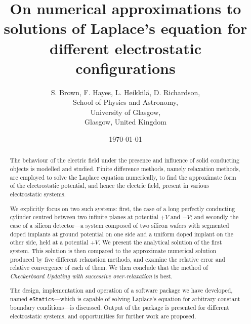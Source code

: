 \documentclass[11pt, a4paper]{article}
\begin{document}
\title{On numerical approximations to solutions of Laplace's equation for different
electrostatic configurations}
\author{S. Brown, F. Hayes, L. Heikkil{\"a}, D. Richardson,\\
	School of Physics and Astronomy,\\
	University of Glasgow,\\
	Glasgow, United Kingdom}
\date{\today}
\maketitle

\begin{abstract}

The behaviour of the electric field under the presence and influence of solid
conducting objects is modelled and studied. Finite difference methods, namely
relaxation methods, are employed to solve the Laplace equation numerically,
to find the approximate form of the electrostatic potential, and hence the electric
field, present in various electrostatic systems.

We explicitly focus on two such systems: first, the case of a long perfectly conducting
cylinder centred between two infinite planes at potential $+V$ and $-V$; and secondly 
the case of a silicon detector---a system composed of two silicon wafers with segmented
doped implants at ground potential on one side and a uniform doped implant on the
other side, held at a potential $+V$. We present the analytical solution of the first
system. This solution is then compared to the approximate numerical solution produced
by five different relaxation methods, and examine the relative error and relative
convergence of each of them. We then conclude that the method of 
\emph{Checkerboard Updating with successive over-relaxation} is best.

The design, implementation and operation of a software package we have
developed, named \lstinline|eStatics|---which is capable of solving
Laplace's equation for arbitrary constant boundary conditions---is discussed.
Output of the package is presented for different electrostatic systems, and
opportunities for further work are proposed.

\end{abstract}

\newpage                       %
\tableofcontents               %
\newpage                       %
\end{document}
